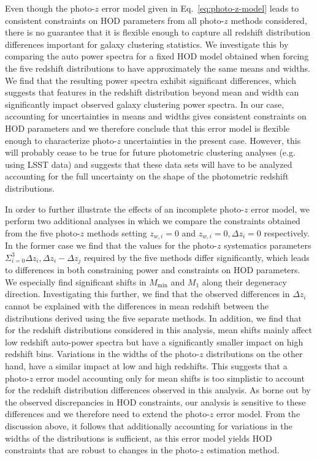 \documentclass[a4paper,11pt]{article}
\begin{document}
      Even though the photo-$z$ error model given in Eq.~\ref{eq:photo-z-model} leads to consistent constraints on HOD parameters from all photo-$z$ methods considered, there is no guarantee that it is flexible enough to capture all redshift distribution differences important for galaxy clustering statistics. We investigate this by comparing the auto power spectra for a fixed HOD model obtained when forcing the five redshift distributions to have approximately the same means and widths. We find that the resulting power spectra exhibit significant differences, which suggests that features in the redshift distribution beyond mean and width can significantly impact observed galaxy clustering power spectra. In our case, accounting for uncertainties in means and widths gives consistent constraints on HOD parameters and we therefore conclude that this error model is flexible enough to characterize photo-$z$ uncertainties in the present case. However, this will probably cease to be true for future photometric clustering analyses (e.g. using LSST data) and suggests that these data sets will have to be analyzed accounting for the full uncertainty on the shape of the photometric redshift distributions.

      In order to further illustrate the effects of an incomplete photo-$z$ error model, we perform two additional analyses in which we compare the constraints obtained from the five photo-$z$ methods setting $z_{w, i} = 0$ and $z_{w, i} = 0, \Delta z_{i} = 0$ respectively. In the former case we find that the values for the photo-$z$ systematics parameters $\Sigma_{i=0}^{3} \Delta z_{i}, \Delta z_{i} - \Delta z_{j}$ required by the five methods differ significantly, which leads to differences in both constraining power and constraints on HOD parameters. We especially find significant shifts in $M_{\mathrm{min}}$ and $M_{1}$ along their degeneracy direction. Investigating this further, we find that the observed differences in $\Delta z_{i}$ cannot be explained with the differences in mean redshift between the distributions derived using the five separate methods. In addition, we find that for the redshift distributions considered in this analysis, mean shifts mainly affect low redshift auto-power spectra but have a significantly smaller impact on high redshift bins. Variations in the widths of the photo-$z$ distributions on the other hand, have a similar impact at low and high redshifts. This suggests that a photo-$z$ error model accounting only for mean shifts is too simplistic to account for the redshift distribution differences observed in this analysis. As borne out by the observed discrepancies in HOD constraints, our analysis is sensitive to these differences and we therefore need to extend the photo-$z$ error model. From the discussion above, it follows that additionally accounting for variations in the widths of the distributions is sufficient, as this error model yields HOD constraints that are robust to changes in the photo-$z$ estimation method.
\end{document}
